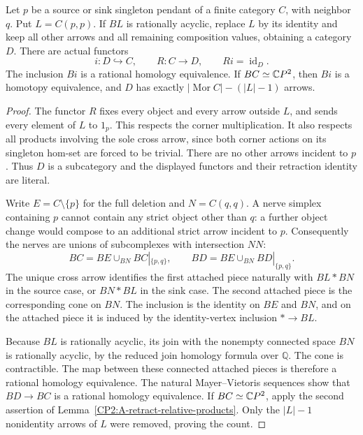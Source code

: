 \begin{proposition}
\label{CP2:A-singleton-pendant-corner-retract}
Let $p$ be a source or sink singleton pendant of a finite category
$C$, with neighbor $q$. Put $L=C(p,p)$. If $BL$ is rationally
acyclic, replace $L$ by its identity and keep all other arrows
and all remaining composition values, obtaining a category $D$.
There are actual functors
\[
 i:D\hookrightarrow C,\qquad R:C\longrightarrow D,
 \qquad Ri=\operatorname{id}_D.
\]
The inclusion $Bi$ is a rational homology equivalence. If
$BC\simeq\mathbb{C}P^2$, then $Bi$ is a homotopy equivalence, and
$D$ has exactly $|\operatorname{Mor}C|-(|L|-1)$ arrows.
\end{proposition}
\begin{proof}
The functor $R$ fixes every object and every arrow outside $L$,
and sends every element of $L$ to $1_p$. This respects the
corner multiplication. It also respects all products involving
the sole cross arrow, since both corner actions on its singleton
hom-set are forced to be trivial. There are no other arrows
incident to $p$. Thus $D$ is a subcategory and the displayed
functors and their retraction identity are literal.

Write $E=C\setminus\{p\}$ for the full deletion and $N=C(q,q)$.
A nerve simplex containing $p$ cannot contain any strict object
other than $q$: a further object change would compose to an
additional strict arrow incident to $p$. Consequently the nerves
are unions of subcomplexes with intersection $NN$:
\[
 BC=BE\cup_{BN}B C|_{\{p,q\}},\qquad
 BD=BE\cup_{BN}B D|_{\{p,q\}}.
\]
The unique cross arrow identifies the first attached piece
naturally with $BL*BN$ in the source case, or $BN*BL$ in the
sink case. The second attached piece is the corresponding cone
on $BN$. The inclusion is the identity on $BE$ and $BN$, and
on the attached piece it is induced by the identity-vertex
inclusion $*\to BL$.

Because $BL$ is rationally acyclic, its join with the nonempty
connected space $BN$ is rationally acyclic, by the reduced join
homology formula over $\mathbb Q$. The cone is contractible.
The map between these connected attached pieces is therefore a
rational homology equivalence. The natural Mayer--Vietoris
sequences show that $BD\to BC$ is a rational homology
equivalence. If $BC\simeq\mathbb{C}P^2$, apply the second assertion of
Lemma~\ref{CP2:A-retract-relative-products}. Only the $|L|-1$
nonidentity arrows of $L$ were removed, proving the count.
\end{proof}

